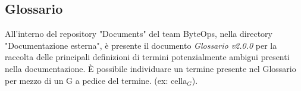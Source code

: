 \subsection{Glossario}
All'interno del repository "Documents" del team ByteOps, nella directory "Documentazione esterna", è presente il documento \textit{Glossario v2.0.0} per la raccolta delle principali definizioni di termini potenzialmente ambigui presenti nella documentazione.
È possibile individuare un termine presente nel Glossario per mezzo di un G a pedice del termine. (ex: cella\(_G\)).
